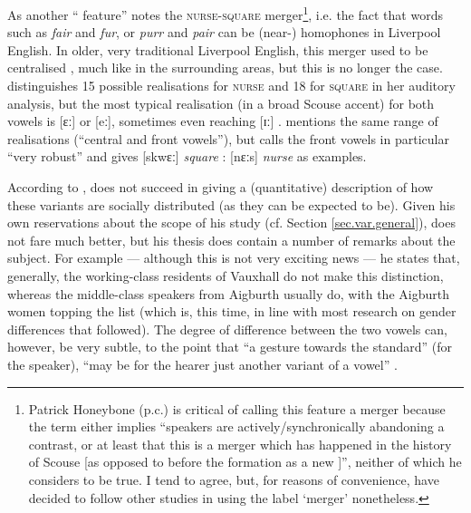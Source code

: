 As another `` feature'' \citet[72]{trudgill1999} notes the \textsc{nurse}-\textsc{square} merger\footnote{Patrick Honeybone (p.c.) is critical of calling this feature a merger because the term either implies \enquote{speakers are actively/synchronically abandoning a contrast, or at least that this is a merger which has happened in the history of Scouse [as opposed to before the formation as a new ]}, neither of which he considers to be true. I tend to agree, but, for reasons of convenience, have decided to follow other studies \parencite{trudgill1999,watsonclark2013} in using the label \enquote*{merger} nonetheless.}, i.e. the fact that words such as \emph{fair} and \emph{fur}, or \emph{purr} and \emph{pair} can be (near-) homophones in Liverpool English.
In older, very traditional Liverpool English, this merger used to be centralised \parencite[cf.][323]{west2015}, much like in the surrounding areas, but this is no longer the case.
\citet[cf.][68 and 71]{delyon1981} distinguishes 15 possible realisations for \textsc{nurse} and 18 for \textsc{square} in her auditory analysis, but the most typical realisation (in a broad Scouse accent) for both vowels is [ɛː] or [eː], sometimes even reaching [ɪː] \citep[cf.][358]{watson2007}.
\citet[127]{honeybone2007} mentions the same range of realisations (``central and front vowels''), but calls the front vowels in particular ``very robust'' and gives [skwɛː] \emph{square} : [nɛːs] \emph{nurse} as examples.

According to \citet[358]{watson2007}, \textcite{delyon1981} does not succeed in giving a (quantitative) description of how these variants are socially distributed (as they can be expected to be).
Given his own reservations about the scope of his study (cf. Section \ref{sec.var.general}), \citet{knowles1973} does not fare much better, but his thesis does contain a number of remarks about the subject.
For example --- although this is not very exciting news --- he states that, generally, the working-class residents of Vauxhall do not make this distinction, whereas the middle-class speakers from Aigburth usually do, with the Aigburth women topping the list (which is, this time, in line with most research on gender differences that followed).
The degree of difference between the two vowels can, however, be very subtle, to the point that ``a gesture towards the  standard'' (for the speaker), ``may be for the hearer just another variant of a  vowel'' \citep[cf.][295--297]{knowles1973}.

